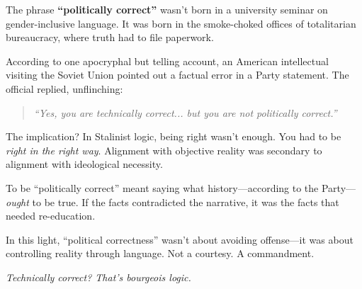 \begin{tcolorbox}[title=Sidebar: “Politically Correct” — When Truth Requires a Permit, colback=black!5!white, colframe=black, fonttitle=\bfseries, coltitle=black]

The phrase \textbf{“politically correct”} wasn’t born in a university seminar on gender-inclusive language. It was born in the smoke-choked offices of totalitarian bureaucracy, where truth had to file paperwork.

According to one apocryphal but telling account, an American intellectual visiting the Soviet Union pointed out a factual error in a Party statement. The official replied, unflinching:
\begin{quote}
\textit{“Yes, you are technically correct... but you are not politically correct.”}
\end{quote}

The implication? In Stalinist logic, being right wasn’t enough. You had to be \emph{right in the right way}.  
Alignment with objective reality was secondary to alignment with ideological necessity.

To be “politically correct” meant saying what history—according to the Party—\emph{ought} to be true. If the facts contradicted the narrative, it was the facts that needed re-education.

In this light, “political correctness” wasn’t about avoiding offense—it was about controlling reality through language. Not a courtesy. A commandment.

\textit{Technically correct? That’s bourgeois logic.}

\end{tcolorbox}


